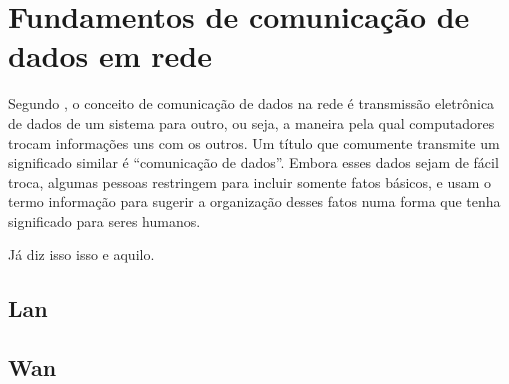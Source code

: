 \section{Fundamentos de comunicação de dados em rede}
Segundo \citet{gallo2003comunicaccao}, o conceito de comunicação de dados na rede é transmissão eletrônica de dados
de um sistema para outro, ou seja, a maneira pela qual computadores trocam informações
uns com os outros. Um título que comumente transmite um significado similar é
“comunicação de dados”. Embora esses dados sejam de fácil troca, algumas pessoas restringem
para incluir somente fatos básicos, e usam o termo informação para sugerir a
organização desses fatos numa forma que tenha significado para seres humanos.

Já \citet{forouzan2009comunicaccao} diz isso isso e aquilo.

\lipsum[1]

	\subsection{Lan}
	\lipsum[1]
	
	\subsection{Wan}
	\lipsum[1]